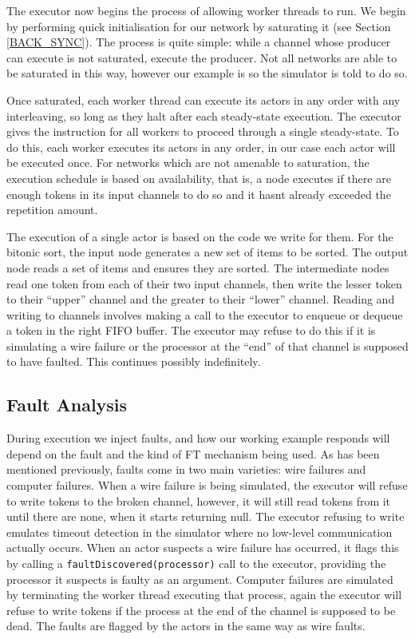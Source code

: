 The executor now begins the process of allowing worker threads to run.
We begin by performing quick initialisation for our network by saturating it (see Section \ref{BACK_SYNC}).
The process is quite simple: while a channel whose producer can execute is not saturated, execute the producer.
Not all networks are able to be saturated in this way, however our example is so the simulator is told to do so.

Once saturated, each worker thread can execute its actors in any order with any interleaving, so long as they halt after each steady-state execution.
The executor gives the instruction for all workers to proceed through a single steady-state.
To do this, each worker executes its actors in any order, in our case each actor will be executed once.
For networks which are not amenable to saturation, the execution schedule is based on availability, that is, a node executes if there are enough tokens in its input channels to do so and it hasnt already exceeded the repetition amount.

The execution of a single actor is based on the code we write for them.
For the bitonic sort, the input node generates a new set of items to be sorted.
The output node reads a set of items and ensures they are sorted.
The intermediate nodes read one token from each of their two input channels, then write the lesser token to their ``upper'' channel and the greater to their ``lower'' channel.
Reading and writing to channels involves making a call to the executor to enqueue or dequeue a token in the right FIFO buffer.
The executor may refuse to do this if it is simulating a wire failure or the processor at the ``end'' of that channel is supposed to have faulted.
This continues possibly indefinitely.

\subsection{Fault Analysis}

During execution we inject faults, and how our working example responds will depend on the fault and the kind of FT mechanism being used.
As has been mentioned previously, faults come in two main varieties: wire failures and computer failures.
When a wire failure is being simulated, the executor will refuse to write tokens to the broken channel, however, it will still read tokens from it until there are none, when it starts returning null.
The executor refusing to write emulates timeout detection in the simulator where no low-level communication actually occurs.
When an actor suspects a wire failure has occurred, it flags this by calling a \verb=faultDiscovered(processor)= call to the executor, providing the processor it suspects is faulty as an argument.
Computer failures are simulated by terminating the worker thread executing that process, again the executor will refuse to write tokens if the process at the end of the channel is supposed to be dead.
The faults are flagged by the actors in the same way as wire faults.

